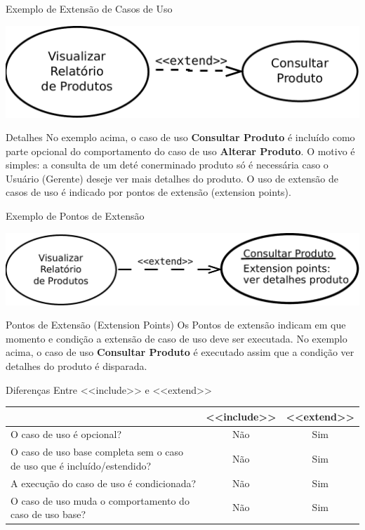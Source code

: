 \documentclass[xcolor=x11names,compress]{beamer}
\begin{document}
\begin{frame}{Exemplo de Extensão de Casos de Uso}

\centering \includegraphics[keepaspectratio,width=.8\textwidth]{Extend_Caso_de_Uso}

\begin{alertblock}{Detalhes}
No exemplo acima, o caso de uso \textbf{Consultar Produto} é incluído como parte opcional do comportamento do caso de uso \textbf{Alterar Produto}. O motivo é simples: a consulta de um deté conerminado produto só é necessária caso o Usuário (Gerente) deseje ver mais detalhes do produto. O uso de extensão de casos de uso é indicado por pontos de extensão (extension points).
\end{alertblock}

\end{frame}

\begin{frame}{Exemplo de Pontos de Extensão}

\centering \includegraphics[keepaspectratio,width=.8\textwidth]{Extend_Caso_de_Uso-extension-point}

\begin{alertblock}{Pontos de Extensão (Extension Points)}
Os Pontos de extensão  indicam em que momento e condição a extensão de caso de uso deve ser executada. No exemplo acima, o caso de uso \textbf{Consultar Produto} é executado assim que a condição ver detalhes do produto é disparada. 
\end{alertblock}

\end{frame}

\begin{frame}{Diferenças Entre <<include>> e <<extend>>}

\begin{tabular}{m{7cm}|c|c}
\hline\hline
& \textbf{<<include>>} & \textbf{<<extend>>}\\ 
\hline
O caso de uso é opcional? & Não & Sim
\\ \hline
O caso de uso base completa sem o caso de uso que é incluído/estendido? & Não & Sim \\ 
\hline
A execução do caso de uso é condicionada? & Não & Sim \\
\hline
O caso de uso muda o comportamento do caso de uso base? & Não & Sim \\
\hline\hline
\end{tabular}

\end{frame}
\end{document}
